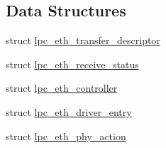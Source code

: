 \subsection*{Data Structures}
\begin{DoxyCompactItemize}
\item 
struct \mbox{\hyperlink{structlpc__eth__transfer__descriptor}{lpc\+\_\+eth\+\_\+transfer\+\_\+descriptor}}
\item 
struct \mbox{\hyperlink{structlpc__eth__receive__status}{lpc\+\_\+eth\+\_\+receive\+\_\+status}}
\item 
struct \mbox{\hyperlink{structlpc__eth__controller}{lpc\+\_\+eth\+\_\+controller}}
\item 
struct \mbox{\hyperlink{structlpc__eth__driver__entry}{lpc\+\_\+eth\+\_\+driver\+\_\+entry}}
\item 
struct \mbox{\hyperlink{structlpc__eth__phy__action}{lpc\+\_\+eth\+\_\+phy\+\_\+action}}
\end{DoxyCompactItemize}
